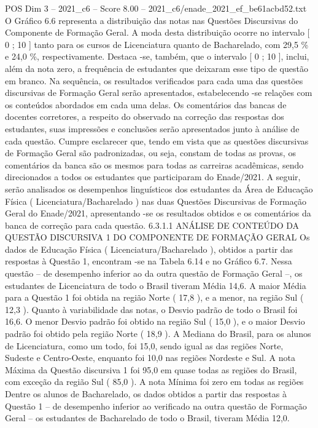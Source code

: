 \begin{textsample}{POS Dim 3 – 2021\_c6 – Score 8.00 – 2021\_c6/enade\_2021\_ef\_be61acbd52.txt}
O Gráfico 6.6 representa a distribuição das notas nas Questões Discursivas do Componente de Formação Geral.
A moda desta distribuição ocorre no intervalo [ 0 ; 10 ] tanto para os cursos de Licenciatura quanto de Bacharelado, com 29,5 \% e 24,0 \%, respectivamente.
Destaca -se, também, que o intervalo [ 0 ; 10 ], inclui, além da nota zero, a frequência de estudantes que deixaram esse tipo de questão em branco.
Na sequência, os resultados verificados para cada uma das questões discursivas de Formação Geral serão apresentados, estabelecendo -se relações com os conteúdos abordados em cada uma delas.
Os comentários das bancas de docentes corretores, a respeito do observado na correção das respostas dos estudantes, suas impressões e conclusões serão apresentados junto à análise de cada questão.
Cumpre esclarecer que, tendo em vista que as questões discursivas de Formação Geral são padronizadas, ou seja, constam de todas as provas, os comentários da banca são os mesmos para todas as carreiras acadêmicas, sendo direcionados a todos os estudantes que participaram do Enade/2021.
A seguir, serão analisados os desempenhos linguísticos dos estudantes da Área de Educação Física ( Licenciatura/Bacharelado ) nas duas Questões Discursivas de Formação Geral do Enade/2021, apresentando -se os resultados obtidos e os comentários da banca de correção para cada questão. 6.3.1.1 ANÁLISE DE CONTEÚDO DA QUESTÃO DISCURSIVA 1 DO COMPONENTE DE FORMAÇÃO GERAL Os dados de Educação Física ( Licenciatura/Bacharelado ), obtidos a partir das respostas à Questão 1, encontram -se na Tabela 6.14 e no Gráfico 6.7.
Nessa questão – de desempenho inferior ao da outra questão de Formação Geral –, os estudantes de Licenciatura de todo o Brasil tiveram Média 14,6.
A maior Média para a Questão 1 foi obtida na região Norte ( 17,8 ), e a menor, na região Sul ( 12,3 ).
Quanto à variabilidade das notas, o Desvio padrão de todo o Brasil foi 16,6.
O menor Desvio padrão foi obtido na região Sul ( 15,0 ), e o maior Desvio padrão foi obtido pela região Norte ( 18,9 ).
A Mediana do Brasil, para os alunos de Licenciatura, como um todo, foi 15,0, sendo igual as das regiões Norte, Sudeste e Centro-Oeste, enquanto foi 10,0 nas regiões Nordeste e Sul.
A nota Máxima da Questão discursiva 1 foi 95,0 em quase todas as regiões do Brasil, com exceção da região Sul ( 85,0 ).
A nota Mínima foi zero em todas as regiões Dentre os alunos de Bacharelado, os dados obtidos a partir das respostas à Questão 1 – de desempenho inferior ao verificado na outra questão de Formação Geral – os estudantes de Bacharelado de todo o Brasil, tiveram Média 12,0.

\end{textsample}

